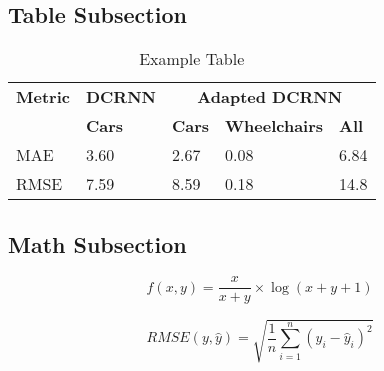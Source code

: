\subsection{Table Subsection}\label{subsec:table-subsection}
\lipsum[1]
\begin{table}[htbp]
    \caption{
        Example Table
    }
    \center
    \begin{tabular}{@{}lllll@{}}
        \toprule
        \textbf{Metric} & \textbf{DCRNN} & \multicolumn{3}{c}{\textbf{Adapted DCRNN}} \\
        & \textbf{Cars} & \textbf{Cars} & \textbf{Wheelchairs} & \textbf{All} \\
        \midrule
        MAE  & 3.60          & 2.67          & 0.08                 & 6.84         \\
        RMSE & 7.59          & 8.59          & 0.18                 & 14.8         \\
        \bottomrule
    \end{tabular}
    \label{tab:example-table}
\end{table}

\subsection{Math Subsection}\label{subsec:math-subsection}
\lipsum[1]
\begin{equation}
    f(x, y) = \frac{x}{x + y} \times \log(x + y + 1)\label{eq:accessibility_score}
\end{equation}

\begin{equation}
    RMSE(y, \hat{y}) = \sqrt{\frac{1}{n} \sum_{i=1}^{n} \left( y_i - \hat{y}_i \right)^2}\label{eq:rmse}
\end{equation}